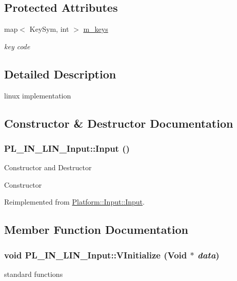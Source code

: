\subsection*{Protected Attributes}
\begin{DoxyCompactItemize}
\item 
\hypertarget{classPlatform_1_1Input_1_1Linux_1_1Input_a96bdcf7b29124ebb525b0e1ac26b25ba}{
map$<$ KeySym, int $>$ \hyperlink{classPlatform_1_1Input_1_1Linux_1_1Input_a96bdcf7b29124ebb525b0e1ac26b25ba}{m\_\-keys}}
\label{classPlatform_1_1Input_1_1Linux_1_1Input_a96bdcf7b29124ebb525b0e1ac26b25ba}

\begin{DoxyCompactList}\small\item\em key code \item\end{DoxyCompactList}\end{DoxyCompactItemize}


\subsection{Detailed Description}
linux implementation 

\subsection{Constructor \& Destructor Documentation}
\hypertarget{classPlatform_1_1Input_1_1Linux_1_1Input_a4d092b21c9937be42de3ec9b182959a8}{
\subsubsection[{Input}]{\setlength{\rightskip}{0pt plus 5cm}PL\_\-IN\_\-LIN\_\-Input::Input ()}}
\label{classPlatform_1_1Input_1_1Linux_1_1Input_a4d092b21c9937be42de3ec9b182959a8}
Constructor and Destructor

Constructor 

Reimplemented from \hyperlink{classPlatform_1_1Input_1_1Input_afa32146b371e45509eef59474e6b0ef2}{Platform::Input::Input}.

\subsection{Member Function Documentation}
\hypertarget{classPlatform_1_1Input_1_1Linux_1_1Input_adfac30a8469aab931f5212c251104857}{
\subsubsection[{VInitialize}]{\setlength{\rightskip}{0pt plus 5cm}void PL\_\-IN\_\-LIN\_\-Input::VInitialize ({\bf Void} $\ast$ {\em data})}}
\label{classPlatform_1_1Input_1_1Linux_1_1Input_adfac30a8469aab931f5212c251104857}
standard functions

